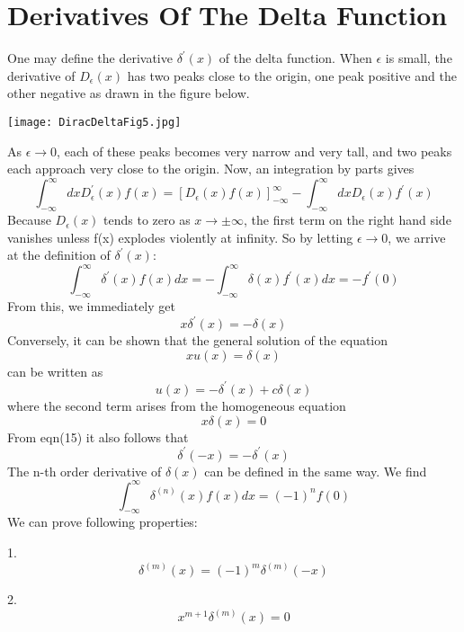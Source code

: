 \section*{Derivatives Of The Delta Function}
One may define the derivative $\delta^\prime (x)$ of the delta function. When $\epsilon$ is small, the derivative of $D_\epsilon (x)$ has two peaks close to the origin, one peak positive and the other negative as drawn in the figure below.
\vspace{0.2cm}
\begin{center}
\texttt{[image: DiracDeltaFig5.jpg]}
\end{center}
As $\epsilon \to 0$, each of these peaks becomes very narrow and very tall, and two peaks each approach very close to the origin. Now, an integration by parts gives
\begin{equation}
\int_{-\infty}^{\infty} dx D_\epsilon^\prime (x) f(x) = [D_\epsilon (x) f(x)]_{-\infty}^{\infty} - \int_{-\infty}^{\infty} dx D_\epsilon (x) f^\prime (x)
\end{equation}
Because $D_\epsilon (x)$ tends to zero as $x \to \pm \infty$, the first term on the right hand side vanishes unless f(x) explodes violently at infinity. So by letting $\epsilon \to 0$, we arrive at the definition of $\delta^\prime (x)$: 
\begin{equation}
\int_{-\infty}^{\infty} \delta^\prime (x) f(x) dx = - \int_{-\infty}^{\infty} \delta (x) f^\prime(x) dx = - f^\prime (0)
\end{equation}
From this, we immediately get 
\begin{equation}
x\delta^\prime (x) = - \delta (x)
\end{equation}
Conversely, it can be shown that the general solution of the equation $$xu(x)=\delta(x)$$ can be written as $$u(x) = - \delta^\prime (x) + c \delta(x)$$ where the second term arises from the homogeneous equation $$x\delta(x)=0$$
From eqn(15) it also follows that
\begin{equation}
\delta^\prime(-x) = - \delta^\prime(x)
\end{equation}
The n-th order derivative of $\delta(x)$ can be defined in the same way. We find
\begin{equation}
\int_{-\infty}^{\infty} \delta^{(n)} (x) f(x) dx = (-1)^n f(0)
\end{equation}
We can prove following properties:

1.$$\delta^{(m)} (x) = (-1)^m \delta^{(m)} (-x)$$

2.$$x^{m+1} \delta^{(m)} (x) = 0$$

